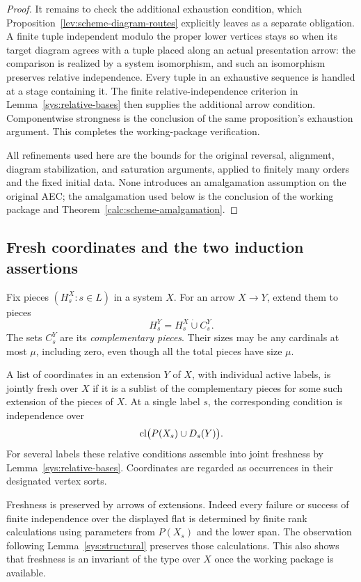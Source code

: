 \begin{proof}
It remains to check the additional exhaustion condition, which
Proposition~\ref{lev:scheme-diagram-routes} explicitly leaves as a
separate obligation.  A finite tuple independent modulo the
proper lower vertices stays so when its target diagram agrees with
a tuple placed along an actual presentation arrow: the comparison
is realized by a system isomorphism, and such an isomorphism
preserves relative independence.  Every tuple in an exhaustive
sequence is handled at a stage containing it.  The finite
relative-independence criterion in Lemma~\ref{sys:relative-bases}
then supplies the additional arrow condition.  Componentwise
strongness is the conclusion of the same proposition's exhaustion
argument.  This completes the working-package verification.

All refinements used here are the bounds for the original reversal,
alignment, diagram stabilization, and saturation arguments, applied
to finitely many orders and the fixed initial data.  None introduces
an amalgamation assumption on the original AEC; the amalgamation
used below is the conclusion of the working package and
Theorem~\ref{calc:scheme-amalgamation}.
\end{proof}

\subsection{Fresh coordinates and the two induction assertions}

Fix pieces $(H_s^X:s\in L)$ in a system $X$.
For an arrow $X\to Y$, extend them to pieces
\[
 H_s^Y=H_s^X\mathbin{\dot\cup}C_s^Y.
\]
The sets $C_s^Y$ are its \emph{complementary pieces}.  Their sizes
may be any cardinals at most $\mu$, including zero, even though all
the total pieces have size $\mu$.

\begin{definition}
\label{sys:fresh}
A list of coordinates in an extension $Y$ of $X$, with individual
active labels, is jointly fresh over $X$ if it is a sublist of the
complementary pieces for some such extension of the pieces of $X$.
At a single label $s$, the corresponding condition is independence
over
\[
 \operatorname{cl}\bigl(P(X_s)\cup D_s(Y)\bigr).
\]
For several labels these relative conditions assemble into joint
freshness by Lemma~\ref{sys:relative-bases}.  Coordinates are
regarded as occurrences in their designated vertex sorts.
\end{definition}

Freshness is preserved by arrows of extensions.  Indeed every
failure or success of finite independence over the displayed flat
is determined by finite rank calculations using parameters from
$P(X_s)$ and the lower span.  The observation following
Lemma~\ref{sys:structural} preserves those calculations.  This also
shows that freshness is an invariant of the type over $X$ once the
working package is available.

